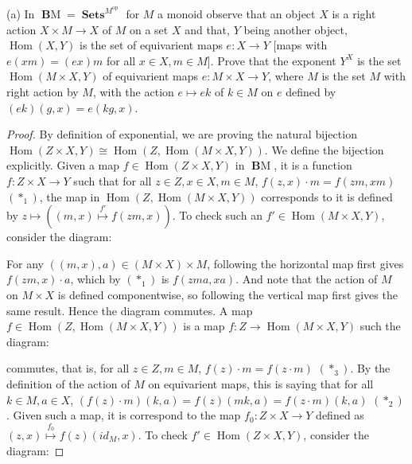 \documentclass[a4paper]{article}
\DeclareMathOperator{\Sets}{\mathbf {Sets}}
\DeclareMathOperator{\op}{op}
\DeclareMathOperator{\BM}{\mathbf BM}
\DeclareMathOperator{\Hom}{\text {Hom}}
\begin{document}
\begin{question}
    (a) In $\BM=\Sets^{M^{\op}}$ for $M$ a monoid observe that an object $X$ is a right action $X\times M\to X$ of $M$ on a set $X$ and that, $Y$ being another object, $\Hom(X,Y)$ is the set of equivarient maps $e: X\to Y$ [maps with $e(xm)=(ex)m$ for all $x\in X,m\in M$]. Prove that the exponent $Y^X$ is the set $\Hom(M\times X,Y)$ of equivarient maps $e: M\times X\to Y$, where $M$ is the set $M$ with right action by $M$, with the action $e\mapsto ek$ of $k\in M$ on $e$ defined by $(ek)(g,x)=e(kg,x)$.\newline
    \begin{proof}
        By definition of exponential, we are proving the natural bijection $\Hom(Z\times X,Y)\cong \Hom(Z,\Hom(M\times X,Y))$. We define the bijection explicitly.\newline 
        Given a map $f\in \Hom(Z\times X,Y)$ in $\BM$, it is a function $f: Z\times X\to Y$ such that for all $z\in Z,x\in X, m\in M$, $f(z,x)\cdot m = f(zm, xm)$ $(*_1)$, the map in $\Hom(Z,\Hom(M\times X,Y))$ corresponds to it is defined by $z\mapsto ((m,x)\overset{f'}\mapsto f(zm,x))$. To check such an $f'\in \Hom(M\times X,Y)$, consider the diagram:
        \begin{center}
        \end{center}
        For any $((m,x),a)\in (M\times X)\times M$, following the horizontal map first gives $f(zm,x)\cdot a$, which by $(*_1)$ is $f(zma,xa)$. And note that the action of $M$ on $M\times X$ is defined componentwise, so following the vertical map first gives the same result. Hence the diagram commutes.\newline
        A map $f\in \Hom(Z,\Hom(M\times X,Y))$ is a map $f:Z\to \Hom(M\times X,Y)$  such the diagram:
        \begin{center}
        \end{center}
        commutes, that is, for all $z\in Z, m\in M$, $f(z)\cdot m = f(z\cdot m)$ $(*_3)$. By the definition of the action of $M$ on equivarient maps, this is saying that for all $k\in M,a\in X$, $(f(z)\cdot m) (k,a)=f(z)(mk,a)=f(z\cdot m)(k,a)$ $(*_2)$. Given such a map, it is correspond to the map $f_0: Z\times X\to Y$ defined as $(z,x)\overset{f_0}\mapsto f(z)(id_M,x)$. To check $f'\in \Hom(Z\times X,Y)$, consider the diagram:

\end{proof}
\end{question}
\end{document}
